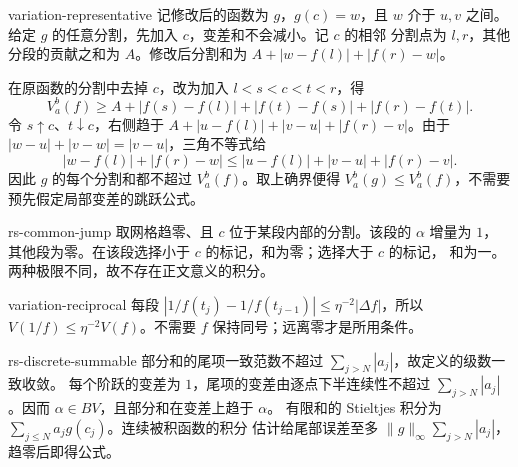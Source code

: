 \begin{solution}{variation-representative}
记修改后的函数为 \(g\)，\(g(c)=w\)，且 \(w\) 介于 \(u,v\) 之间。
给定 \(g\) 的任意分割，先加入 \(c\)，变差和不会减小。记 \(c\) 的相邻
分割点为 \(l,r\)，其他分段的贡献之和为 \(A\)。修改后分割和为
\(A+|w-f(l)|+|f(r)-w|\)。

在原函数的分割中去掉 \(c\)，改为加入 \(l<s<c<t<r\)，得
\[
 V_a^b(f)\ge A+|f(s)-f(l)|+|f(t)-f(s)|+|f(r)-f(t)|.
\]
令 \(s\uparrow c\)、\(t\downarrow c\)，右侧趋于
\(A+|u-f(l)|+|v-u|+|f(r)-v|\)。由于
\(|w-u|+|v-w|=|v-u|\)，三角不等式给
\[
 |w-f(l)|+|f(r)-w|
 \le |u-f(l)|+|v-u|+|f(r)-v|.
\]
因此 \(g\) 的每个分割和都不超过 \(V_a^b(f)\)。取上确界便得
\(V_a^b(g)\le V_a^b(f)\)，不需要预先假定局部变差的跳跃公式。
\end{solution}
\begin{solution}{rs-common-jump}
取网格趋零、且 \(c\) 位于某段内部的分割。该段的 \(\alpha\) 增量为 \(1\)，
其他段为零。在该段选择小于 \(c\) 的标记，和为零；选择大于 \(c\) 的标记，
和为一。两种极限不同，故不存在正文意义的积分。
\end{solution}
\begin{solution}{variation-reciprocal}
每段 \(|1/f(t_j)-1/f(t_{j-1})|\le\eta^{-2}|\Delta f|\)，所以
\(V(1/f)\le\eta^{-2}V(f)\)。不需要 \(f\) 保持同号；远离零才是所用条件。
\end{solution}
\begin{solution}{rs-discrete-summable}
部分和的尾项一致范数不超过 \(\sum_{j>N}|a_j|\)，故定义的级数一致收敛。
每个阶跃的变差为 \(1\)，尾项的变差由逐点下半连续性不超过
\(\sum_{j>N}|a_j|\)。因而 \(\alpha\in BV\)，且部分和在变差上趋于 \(\alpha\)。
有限和的 Stieltjes 积分为 \(\sum_{j\le N}a_jg(c_j)\)。连续被积函数的积分
估计给尾部误差至多 \(\|g\|_\infty\sum_{j>N}|a_j|\)，趋零后即得公式。
\end{solution}
